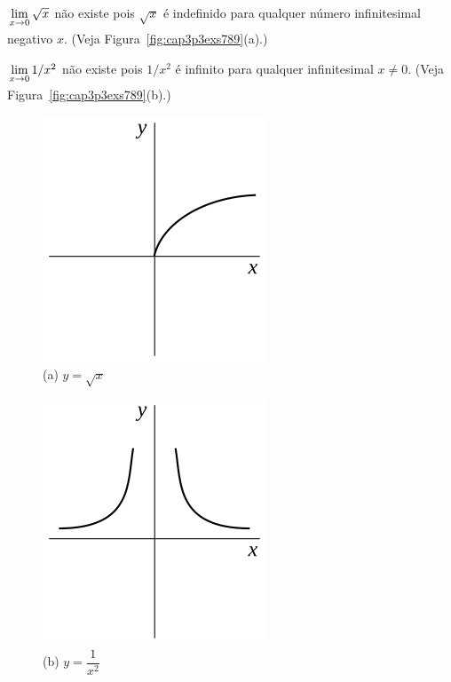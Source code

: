 \begin{example}\label{ex:cap3p3ex7}
$\dslim{x \to 0} \sqrt{x}$ não existe pois $\sqrt{x}$ é indefinido para
qualquer número infinitesimal negativo $x$. (Veja
Figura~\ref{fig:cap3p3exs789}(a).)
\end{example}

\begin{example}\label{ex:cap3p3ex8}
$\dslim{x \to 0} 1/x^2$ não existe pois $1/x^2$ é infinito para qualquer
infinitesimal $x \ne 0$. (Veja Figura~\ref{fig:cap3p3exs789}(b).)
\end{example}

\begin{figure}
\begin{minipage}{0.3\textwidth}
\centering
\includegraphics{cap3p3ex7}\\
(a) \; $y = \sqrt{x}$
\end{minipage}%
\hfill%
\begin{minipage}{0.3\textwidth}
\centering
\includegraphics{cap3p3ex8}\\
(b) \; $y = \dfrac{1}{x^2}$
\end{minipage}%
\hfill%
\begin{minipage}{0.3\textwidth}

\end{minipage}
\end{figure}
